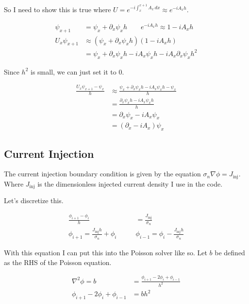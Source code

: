\documentclass[11pt]{article}
\theoremstyle{definition}
\begin{document}
So I need to show this is true where $U = e^{-i \int_x^{x+1} A_x \, dx} \approx e^{-i A_x h}$.

\begin{align}
\psi_{x+1} &= \psi_x + \partial_x \psi_x h \qquad e^{-i A_x h} \approx 1 - i A_x h \label{eq:link-expand}\\
U_x \psi_{x+1} &\approx (\psi_x + \partial_x \psi_x h)(1 - i A_x h) \label{eq:link-prod}\\
&= \psi_x + \partial_x \psi_x h - i A_x \psi_x h - i A_x\partial_x \psi_x h^2 \label{eq:link-prod-2}
\end{align}

Since $h^2$ is small, we can just set it to 0.

\begin{align}
\frac{U_x \psi_{x+1} - \psi_x}{h} &\approx \frac{\psi_x + \partial_x \psi_x h - i A_x \psi_x h - \psi_x}{h} \label{eq:link-final-1}\\
&= \frac{\partial_x \psi_x h - i A_x \psi_x h}{h} \label{eq:link-final-2}\\
&= \partial_x \psi_x - i A_x \psi_x \label{eq:link-final-3}\\
&= (\partial_x - i A_x) \psi_x \label{eq:link-final-4}
\end{align}

\subsection{Current Injection}
\label{sec:current-injection}

The current injection boundary condition is given by the equation $\sigma_n \nabla \phi = J_{\mathrm{inj}}$. Where $J_{\mathrm{inj}}$ is the dimensionless injected current density I use in the code.

Let's discretize this.

\begin{align}
\frac{\phi_{i+1} - \phi_i}{h} &= \frac{J_{\mathrm{inj}}}{\sigma_n} \label{eq:ci-1}\\
\phi_{i+1} = \frac{J_{\mathrm{inj}} h}{\sigma_n} + \phi_i \qquad &\phi_{i-1} = \phi_{i} - \frac{J_{\mathrm{inj}} h}{\sigma_n} \label{eq:ci-2}
\end{align}

With this equation I can put this into the Poisson solver like so. Let $b$ be defined as the RHS of the Poisson equation.

\begin{align}
\nabla^2 \phi = b &= \frac{\phi_{i+1} - 2 \phi_i + \phi_{i-1}}{h^2} \label{eq:ci-poisson-1}\\
\phi_{i+1} - 2 \phi_i + \phi_{i-1} &= b h^2 \label{eq:ci-poisson-2}
\end{align}
\end{document}
